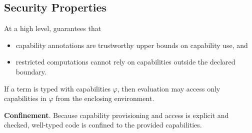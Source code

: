 

\subsection{Security Properties}
\label{sec:security}

At a high level, \lambdaCap{} guarantees that
\begin{itemize}[nosep]
\item capability annotations are trustworthy upper bounds on capability use, and
\item restricted computations cannot rely on capabilities outside the
  declared boundary.
\end{itemize}

If a term is typed with capabilities $\varphi$, then evaluation may access only
capabilities in $\varphi$ from the enclosing environment.

\textbf{Confinement}. %
Because capability provisioning and access is explicit and checked, well-typed
code is confined to the provided capabilities.
